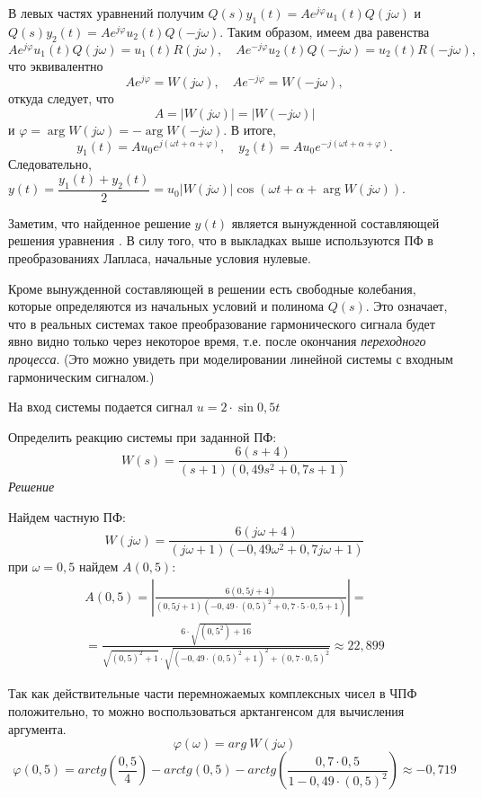 \documentclass[../../TAU.tex]{subfiles}
\begin{document}
    В левых частях уравнений получим ${Q(s)y_1(t) = Ae^{j\varphi}u_1(t)Q(j\omega)}$ и ${Q(s)y_2(t) = Ae^{j\varphi}u_2(t)Q(-j\omega)}$. Таким образом, имеем два равенства
    $$
        Ae^{j\varphi} u_1(t)Q(j\omega) = u_1(t)R(j\omega),\quad Ae^{-j\varphi} u_2(t)Q(-j\omega) = u_2(t)R(-j\omega),
    $$
    что эквивалентно
    $$
        Ae^{j\varphi} = W(j\omega),\quad Ae^{-j\varphi} = W(-j\omega),
    $$
    откуда следует, что 
    $$
        A = |W(j\omega)| = |W(-j\omega)|
    $$ 
    и 
    ${\varphi = \arg W(j\omega) = -\arg W(-j\omega)}$. В итоге,
    $$
        y_1(t) = Au_0e^{j(\omega t + \alpha + \varphi)},\quad
        y_2(t) = Au_0e^{-j(\omega t + \alpha + \varphi)}.
    $$
    Следовательно, ${y(t) = \dfrac{y_1(t)+y_2(t)}{2} = u_0|W(j\omega)| \cos(\omega t + \alpha + \arg W(j\omega))}$.

    Заметим, что найденное решение $y(t)$ является вынужденной составляющей решения уравнения .  В силу того, что в выкладках выше используются ПФ в преобразованиях Лапласа, начальные условия нулевые.

    Кроме вынужденной составляющей в решении есть свободные колебания, которые определяются из начальных условий и полинома $Q(s)$. Это означает, что в реальных системах такое преобразование гармонического сигнала будет явно видно только через некоторое время, т.е. после окончания {\it переходного процесса}. (Это можно увидеть при моделировании линейной системы с входным гармоническим сигналом.)

    \examp На вход системы подается сигнал  ${u=2\cdot\sin{0{,}5t}}$

    Определить реакцию системы при заданной ПФ:
    \[
        W(s)=\frac{6(s+4)}{(s+1)(0{,}49s^2+0,7s+1)}    
    \]
    \textit{Решение}

    Найдем частную ПФ:
    \[
        W(j\omega)=\frac{6(j\omega+4)}{(j\omega+1)(-0{,}49\omega^2+0{,}7j\omega+1)}
    \]
    при ${\omega=0{,}5}$ найдем ${A(0{,}5)}$:
    \begin{multline*}
        A(0{,}5)=\left|\frac{6(0{,}5j+4)}{(0{,}5j+1)(-0{,}49\cdot(0{,}5)^2+0{,}7\cdot5\cdot0{,}5+1)}\right|= \\
        =\frac{6\cdot\sqrt{(0{,}5^2)+16}}{\sqrt{(0{,}5)^2+1}\cdot\sqrt{(-0{,}49\cdot(0{,}5)^2+1)^2+(0{,}7\cdot0{,}5)^2}}\approx22{,}899
    \end{multline*}

    Так как действительные части перемножаемых комплексных чисел в ЧПФ положительно, то можно воспользоваться арктангенсом для вычисления аргумента.  
    \[
        \varphi(\omega)=arg\ W(j\omega)
    \]
    \[
        \varphi(0{,}5)=arctg\left(\frac{0{,}5}{4}\right)-arctg(0{,}5)-arctg\left(\frac{0{,}7\cdot0{,}5}{1-0{,}49\cdot(0{,}5)^2}\right)\approx-0{,}719
    \]
\end{document}
